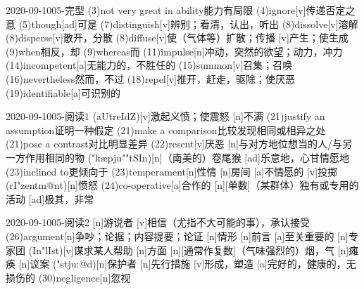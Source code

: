\documentclass[12pt]{ctexart}
\begin{document}
\begin{wordlist}{2020-09-10}{05-完型}
  \word(3){not very great in ability}{能力有局限}
  \word(4){ignore}[v]{传递否定之意}
  \word(5){though}[ad]{可是}
  \word(7){distinguish}[v]{辨别；看清，认出，听出}
  \word(8){dissolve}[v]{溶解}
  \word(8){disperse}[v]{散开，分散}
  \word(8){diffuse}[v]{使（气体等）扩散；传播}
  [v]{产生；使生成}
  \word(9){when}{相反，却}
  \word(9){whereas}{而}
  \word(11){impulse}[n]{冲动，突然的欲望；动力，冲力}
  \word(14){incompetent}[a]{无能力的，不胜任的}
  \word(15){summon}[v]{召集；召唤}
  \word(16){nevertheless}{然而，不过}
  \word(18){repel}[v]{推开，赶走，驱除；使厌恶}
  \word(19){identifiable}[a]{可识别的}
\end{wordlist}
\begin{wordlist}{2020-09-10}{05-阅读1}
  (aUtreIdZ)[v]{激起义愤；使震怒}
  [n]{不满}
  \word(21){justify an assumption}{证明一种假定}
  \word(21){make a comparison}{比较发现相同或相异之处}
  \word(21){pose a contrast}{对比明显差异}
  \word(22){resent}[v]{厌恶}
  [n]{与对方地位想当的人/与另一方作用相同的物}
  ("k\ae pju""tSIn)[n]{（南美的）卷尾猴}
  [ad]{乐意地，心甘情愿地}
  \word(23){inclined to}{更倾向于}
  \word(23){temperament}[n]{性情}
  [n]{房间}
  [a]{不情愿的}
  [v]{投掷}
  (rI"zentm@nt)[n]{愤怒}
  \word(24){co-operative}[a]{合作的}
  [n]{[单数]（某群体）独有或专用的活动}
  [ad]{极其，非常}
\end{wordlist}
\begin{wordlist}{2020-09-10}{05-阅读2}
  [n]{游说者}
  [v]{相信（尤指不大可能的事），承认接受}
  \word(26){argument}[n]{争吵；论据；内容提要；论证}
  [n]{情形}
  [n]{前言}
  [a]{至关重要的}
  [n]{专家团}
  (In"lIst)[v]{谋求某人帮助}
  [n]{方面}
  [n]{[通常作复数]（气味强烈的）烟，气}
  [n]{瘫痪}
  [n]{议案}
  ("stju:@d)[n]{保护者}
  [n]{先行措施}
  [v]{形成，塑造}
  [a]{完好的，健康的，无损伤的}
  \word(30){negligence}[n]{忽视}
\end{wordlist}
\end{document}
